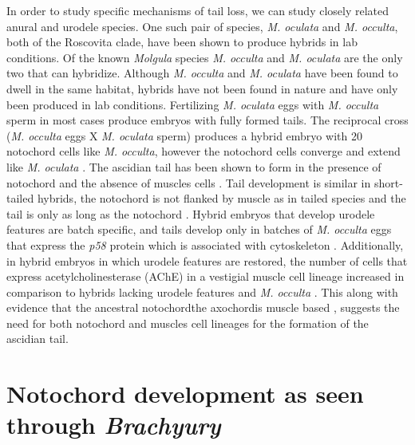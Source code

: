 In order to study specific mechanisms of tail loss, we can study closely related anural and urodele species.  One such pair of species, \textit{M. oculata} and \textit{M. occulta}, both of the Roscovita clade, have been shown to produce hybrids in lab conditions. Of the known \textit{Molgula} species \textit{M. occulta} and \textit{M. oculata} are the only two that can hybridize. Although \textit{M. occulta} and \textit{M. oculata} have been found to dwell in the same habitat, hybrids have not been found in nature and have only been produced in lab conditions. Fertilizing \textit{M. oculata} eggs with \textit{M. occulta} sperm in most cases produce embryos with fully formed tails. The reciprocal cross (\textit{M. occulta} eggs X \textit{M. oculata} sperm) produces a hybrid embryo with 20 notochord cells like \textit{M. occulta}, however the notochord cells converge and extend like \textit{M. oculata} \cite{swalla_interspecific_1990}. The ascidian tail has been shown to form in the presence of notochord and the absence of muscles cells \cite{miyamoto_formation_1985}. Tail development is similar in short-tailed hybrids, the notochord is not flanked by muscle as in tailed species and the tail is only as long as the notochord \cite{swalla_novel_1993}. Hybrid embryos that develop urodele features are batch specific, and tails develop only in batches of \textit{M. occulta} eggs that express the \textit{p58} protein which is associated with cytoskeleton \cite{swalla_identification_1991,jeffery_factors_1992}. Additionally, in hybrid embryos in which urodele features are restored, the number of cells that express acetylcholinesterase (AChE) in a vestigial muscle cell lineage increased in comparison to hybrids lacking urodele features and \textit{M. occulta} \cite{jeffery_evolutionary_1991}. This along with evidence that the ancestral notochord\textemdash the axochord\textemdash is muscle based \cite{lauri_development_2014}, suggests the need for both notochord and muscles cell lineages for the formation of the ascidian tail. 

\section{Notochord development as seen through \textit{Brachyury}}

